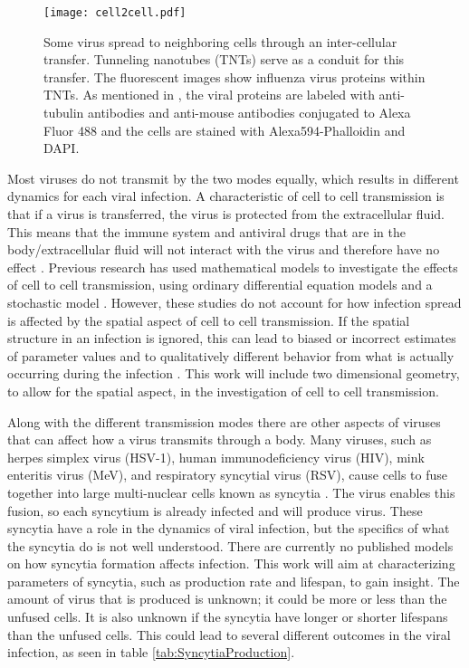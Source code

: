 \documentclass[a4paper]{article}
\begin{document}
\begin{figure}[h]
    \centering
    \texttt{[image: cell2cell.pdf]}
    \caption{Some virus spread to neighboring cells through an inter-cellular transfer. Tunneling nanotubes (TNTs) serve as a conduit for this transfer. The fluorescent images show influenza virus proteins within TNTs. As mentioned in \cite{cell2cell}, the viral proteins are labeled with anti-tubulin antibodies and anti-mouse antibodies conjugated to Alexa Fluor 488 and the cells are stained with Alexa594-Phalloidin and DAPI.}
    \label{fig:cell2cell}
\end{figure}

Most viruses do not transmit by the two modes equally, which results in different dynamics for each viral infection. A characteristic of cell to cell transmission is that if a virus is transferred, the virus is protected from the extracellular fluid. This means that the immune system and antiviral drugs that are in the body/extracellular fluid will not interact with the virus and therefore have no effect \cite{Allen}. Previous research has used mathematical models to investigate the effects of cell to cell transmission, using ordinary differential equation models \cite{Allen, Wang, Pourbashash} and a stochastic model \cite{Allen}. However, these studies do not account for how infection spread is affected by the spatial aspect of cell to cell transmission. If the spatial structure in an infection is ignored, this can lead to biased or incorrect estimates of parameter values and to qualitatively different behavior from what is actually occurring during the infection \cite{Gallagher}. This work will include two dimensional geometry, to allow for the spatial aspect, in the investigation of cell to cell transmission.

Along with the different transmission modes there are other aspects of viruses that can affect how a virus transmits through a body. Many viruses, such as herpes simplex virus (HSV-1), human immunodeficiency virus (HIV), mink enteritis virus (MeV), and respiratory syncytial virus (RSV), cause cells to fuse together into large multi-nuclear cells known as syncytia \cite{Carmichael, Chowdhury, Rozieres, Tian}. The virus enables this fusion, so each syncytium is already infected and will produce virus. These syncytia have a role in the dynamics of viral infection, but the specifics of what the syncytia do is not well understood. There are currently no published models on how syncytia formation affects infection. This work will aim at characterizing parameters of syncytia, such as production rate and lifespan, to gain insight. The amount of virus that is produced is unknown; it could be more or less than the unfused cells. It is also unknown if the syncytia have longer or shorter lifespans than the unfused cells. This could lead to several different outcomes in the viral infection, as seen in table \ref{tab:SyncytiaProduction}.
\end{document}
